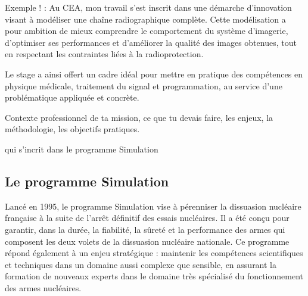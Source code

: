 \documentclass[12pt,a4paper]{report}
\begin{document}
Exemple ! : Au CEA, mon travail s'est inscrit dans une démarche d'innovation visant à modéliser une chaîne radiographique complète. Cette modélisation a pour ambition de mieux comprendre le comportement du système d'imagerie, d'optimiser ses performances et d'améliorer la qualité des images obtenues, tout en respectant les contraintes liées à la radioprotection.

Le stage a ainsi offert un cadre idéal pour mettre en pratique des compétences en physique médicale, traitement du signal et programmation, au service d'une problématique appliquée et concrète.


Contexte professionnel de ta mission, ce que tu devais faire, les enjeux, la méthodologie, les objectifs pratiques.

qui s'incrit dans le programme Simulation

\subsection{Le programme Simulation}
Lancé en 1995, le programme Simulation vise à pérenniser la dissuasion nucléaire française à la suite de l’arrêt définitif des essais nucléaires. Il a été conçu pour garantir, dans la durée, la fiabilité, la sûreté et la performance des armes qui composent les deux volets de la dissuasion nucléaire nationale. Ce programme répond également à un enjeu stratégique : maintenir les compétences scientifiques et techniques dans un domaine aussi complexe que sensible, en assurant la formation de nouveaux experts dans le domaine très spécialisé du fonctionnement des armes nucléaires.
\end{document}
